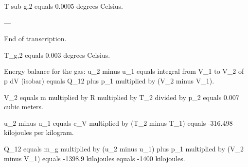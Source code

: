 T sub g,2 equals 0.0005 degrees Celsius.  

---

End of transcription.

T_g,2 equals 0.003 degrees Celsius.  

Energy balance for the gas:  
u_2 minus u_1 equals integral from V_1 to V_2 of p dV (isobar) equals Q_12 plus p_1 multiplied by (V_2 minus V_1).  

V_2 equals m multiplied by R multiplied by T_2 divided by p_2 equals 0.007 cubic meters.  

u_2 minus u_1 equals c_V multiplied by (T_2 minus T_1) equals -316.498 kilojoules per kilogram.  

Q_12 equals m_g multiplied by (u_2 minus u_1) plus p_1 multiplied by (V_2 minus V_1) equals -1398.9 kilojoules equals -1400 kilojoules.